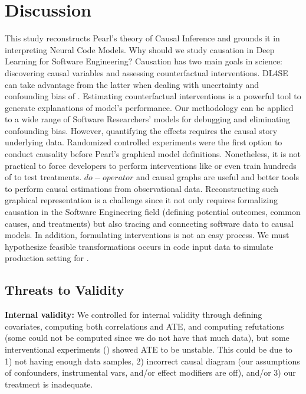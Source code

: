 \section{Discussion}
\label{sec:discussion-conditioned}

This study reconstructs Pearl's theory of Causal Inference and grounds it in interpreting Neural Code Models. Why should we study causation in Deep Learning for Software Engineering? Causation has two main goals in science: discovering causal variables and assessing counterfactual interventions. DL4SE can take advantage from the latter when dealing with uncertainty and confounding bias of \nlms. Estimating counterfactual interventions is a powerful tool to generate explanations of model's performance. Our methodology \codegen can be applied to a wide range of Software Researchers' models for debugging and eliminating confounding bias. However, quantifying the effects requires the causal story underlying data. Randomized controlled experiments were the first option to conduct causality before Pearl's graphical model definitions. Nonetheless, it is not practical to force developers to perform interventions like \datainterII or even train hundreds of \nlms to test treatments. $do-operator$ and causal graphs are useful and better tools to perform causal estimations from observational data. Reconstructing such graphical representation is a challenge since it not only requires formalizing causation in the Software Engineering field (\ie defining potential outcomes, common causes, and treatments) but also tracing and connecting software data to causal models. In addition, formulating interventions is not an easy process. We must hypothesize feasible transformations occurs in code input data to simulate production setting for \nlms. 

\subsection{Threats to Validity}
\noindent\textbf{Internal validity:} We controlled for internal validity through defining covariates, computing both correlations and ATE, and computing refutations (some could not be computed since we do not have that much data), but some interventional experiments (\CommentsTB) showed ATE to be unstable. This could be due to 1) not having enough data samples, 2) incorrect causal diagram (our assumptions of confounders, instrumental vars, and/or effect modifiers are off), and/or 3) our treatment is inadequate.

